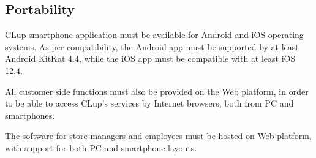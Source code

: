 \documentclass[../../main.tex]{subfiles}
\begin{document}
	\subsection{Portability}

	CLup smartphone application must be available for Android and iOS operating systems. As per compatibility, the Android app must be supported by at least Android KitKat 4.4, while the iOS app must be compatible with at least iOS 12.4.

	All customer side functions must also be provided on the Web platform, in order to be able to access 
	CLup's services by Internet browsers, both from PC and smartphones.

	The software for store managers and employees must be hosted on Web platform, with support for both PC and smartphone layouts.

	
\end{document}
